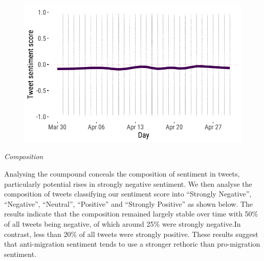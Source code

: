 \documentclass[
  letterpaper,
  DIV=11,
  numbers=noendperiod]{scrreprt}
\begin{document}
\begin{figure}[H]

{\centering \includegraphics{sentiment-analysis_files/figure-pdf/unnamed-chunk-33-1.pdf}

}

\end{figure}

\emph{Composition}

Analysing the coumpound conceals the composition of sentiment in tweets,
particularly potential rises in strongly negative sentiment. We then
analyse the composition of tweets classifying our sentiment score into
``Strongly Negative'', ``Negative'', ``Neutral'', ``Positive'' and
``Strongly Positive'' as shown below. The results indicate that the
composition remained largely stable over time with 50\% of all tweets
being negative, of which around 25\% were strongly negative.In contrast,
less than 20\% of all tweets were strongly positive. These results
suggest that anti-migration sentiment tends to use a stronger rethoric
than pro-migration sentiment.
\end{document}
